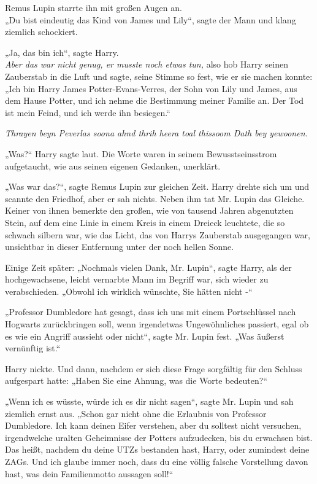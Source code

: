 {Remus Lupin starrte ihn mit großen Augen an.\\ „Du bist eindeutig das Kind von James und Lily“, sagte der Mann und klang ziemlich schockiert.

„Ja, das bin ich“, sagte Harry.\\ \emph{Aber das war nicht genug, er musste noch etwas tun,} also hob Harry seinen Zauberstab in die Luft und sagte, seine Stimme so fest, wie er sie machen konnte: „Ich bin Harry James Potter-Evans-Verres, der Sohn von Lily und James, aus dem Hause Potter, und ich nehme die Bestimmung meiner Familie an. Der Tod ist mein Feind, und ich werde ihn besiegen.“

\emph{Thrayen beyn Peverlas soona ahnd thrih heera toal thissoom Dath bey yewoonen.}

„Was?“ Harry sagte laut. Die Worte waren in seinem Bewusstseinsstrom aufgetaucht, wie aus seinen eigenen Gedanken, unerklärt.

„Was war das?“, sagte Remus Lupin zur gleichen Zeit. Harry drehte sich um und scannte den Friedhof, aber er sah nichts. Neben ihm tat Mr. Lupin das Gleiche. Keiner von ihnen bemerkte den großen, wie von tausend Jahren abgenutzten Stein, auf dem eine Linie in einem Kreis in einem Dreieck leuchtete, die so schwach silbern war, wie das Licht, das von Harrys Zauberstab ausgegangen war, unsichtbar in dieser Entfernung unter der noch hellen Sonne.

Einige Zeit später: „Nochmals vielen Dank, Mr. Lupin“, sagte Harry, als der hochgewachsene, leicht vernarbte Mann im Begriff war, sich wieder zu verabschieden. „Obwohl ich wirklich wünschte, Sie hätten nicht -“

„Professor Dumbledore hat gesagt, dass ich uns mit einem Portschlüssel nach Hogwarts zurückbringen soll, wenn irgendetwas Ungewöhnliches passiert, egal ob es wie ein Angriff aussieht oder nicht“, sagte Mr. Lupin fest. „Was äußerst vernünftig ist.“

Harry nickte. Und dann, nachdem er sich diese Frage sorgfältig für den Schluss aufgespart hatte: „Haben Sie eine Ahnung, was die Worte bedeuten?“

„Wenn ich es wüsste, würde ich es dir nicht sagen“, sagte Mr. Lupin und sah ziemlich ernst aus. „Schon gar nicht ohne die Erlaubnis von Professor Dumbledore. Ich kann deinen Eifer verstehen, aber du solltest nicht versuchen, irgendwelche uralten Geheimnisse der Potters aufzudecken, bis du erwachsen bist. Das heißt, nachdem du deine UTZs bestanden hast, Harry, oder zumindest deine ZAGs. Und ich glaube immer noch, dass du eine völlig falsche Vorstellung davon hast, was dein Familienmotto aussagen soll!“

}
